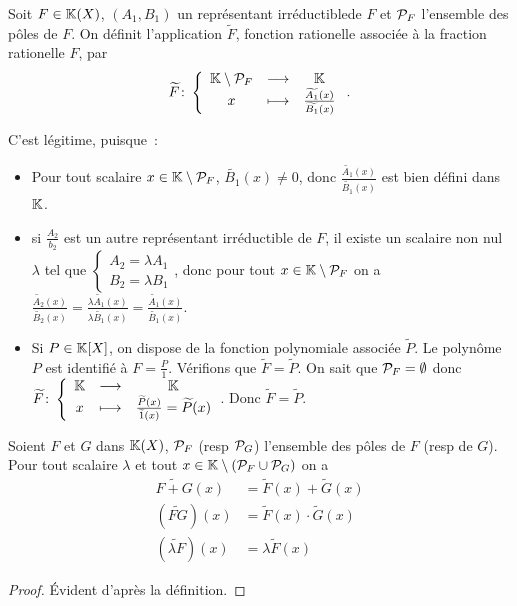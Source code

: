\begin{defdef}
  Soit $F \in \K(X)$, $(A_1,B_1)$ un représentant irréductiblede $F$ et $\P_F$ l'ensemble des pôles de $F$. On définit l'application $\widetilde{F}$, fonction rationelle associée à la fraction rationelle $F$, par
  \begin{equation}
    \fonction{\widetilde{F}}{\K\setminus\P_F}{\K}{x}{\frac{\widetilde{A_1}(x)}{\widetilde{B_1}(x)}}.
  \end{equation}
\end{defdef}

C'est légitime, puisque~:
\begin{itemize}
\item Pour tout scalaire $x \in \K\setminus\P_F$, $\widetilde{B_1}(x) \neq 0$, donc $\frac{\widetilde{A_1}(x)}{\widetilde{B_1}(x)}$ est bien défini dans $\K$.
\item si $\frac{A_2}{b_2}$ est un autre représentant irréductible de $F$, il existe un scalaire non nul $\lambda$ tel que $\begin{cases}A_2 = \lambda A_1 \\ B_2=\lambda B_1\end{cases}$, donc pour tout $x \in \K\setminus\P_F$ on a $\frac{\widetilde{A_2}(x)}{\widetilde{B_2}(x)}=\frac{\lambda \widetilde{A_1}(x)}{\lambda \widetilde{B_1}(x)}=\frac{\widetilde{A_1}(x)}{\widetilde{B_1}(x)}$.
\item Si $P \in \K[X]$, on dispose de la fonction polynomiale associée $\widetilde{P}$. Le polynôme $P$ est identifié à $F=\frac{P}{1}$. Vérifions que $\widetilde{F}=\widetilde{P}$. On sait que $\P_F=\emptyset$ donc $\fonction{\widetilde{F}}{\K}{\K}{x}{\frac{\widetilde{P}(x)}{\widetilde{1}(x)}=\widetilde{P}(x)}$. Donc  $\widetilde{F}=\widetilde{P}$. 
\end{itemize}

\begin{prop}
  Soient $F$ et $G$ dans $\K(X)$, $\P_F$ (resp $\P_G$) l'ensemble des pôles de $F$ (resp de $G$). Pour tout scalaire $\lambda$ et tout $x \in \K\setminus(\P_F \cup \P_G)$ on a
  \begin{align}
    \widetilde{F+G}(x) &= \widetilde{F}(x) + \widetilde{G}(x) \\
    (\widetilde{FG})(x)&= \widetilde{F}(x) \cdot \widetilde{G}(x) \\
    (\widetilde{\lambda F})(x)&=\lambda \widetilde{F}(x)
  \end{align}
\end{prop}
\begin{proof}
  Évident d'après la définition.
\end{proof}

